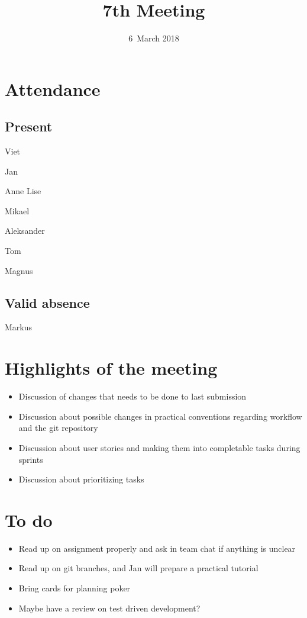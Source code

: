 \documentclass[letterpaper,11pt]{article}
\title{7th Meeting}
\date{6~March 2018}
\begin{document}
\maketitle
\section*{Attendance}
\subsection*{Present}
\begin{list}{}{}
	\item Viet
	\item Jan
	\item Anne Lise
	\item Mikael
	\item Aleksander
	\item Tom
	\item Magnus
\end{list}
\subsection*{Valid absence}
\begin{list}{}{}
	\item Markus
\end{list}

\newpage
\section*{Highlights of the meeting}
\begin{itemize}
	\item Discussion of changes that needs to be done to last submission
	\item Discussion about possible changes in practical conventions regarding workflow and the git repository
	\item Discussion about user stories and making them into completable tasks during sprints
	\item Discussion about prioritizing tasks
\end{itemize}

\section*{To do}
\begin{itemize}
	\item Read up on assignment properly and ask in team chat if anything is unclear
	\item Read up on git branches, and Jan will prepare a practical tutorial
	\item Bring cards for planning poker
	\item Maybe have a review on test driven development?
\end{itemize}
\end{document}
